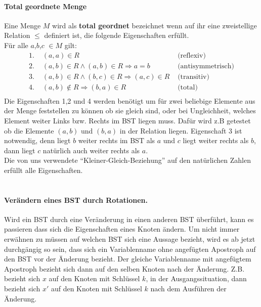 \documentclass[a4paper,12pt]{article}
\begin{document}
\paragraph{Total geordnete Menge} 
Eine Menge $M$ wird als \textbf{total geordnet} bezeichnet wenn auf ihr eine zweistellige Relation $\leq$ definiert ist, die folgende Eigenschaften erfüllt.\\
Für alle $a$,$b$,$c$ $\in M$ gilt:
\begin{align*}
\text{1. } & (a,a) \in R  &\text{  (reflexiv)}\\
\text{2. } & (a,b) \in R  \land  (a,b) \in R \Rightarrow a = b  &\text{  (antisymmetrisch)}\\
\text{3. } & (a,b) \in R  \land  (b,c) \in R \Rightarrow  (a,c) \in R  &\text{  (transitiv)}\\
\text{4. } & (a,b) \notin R \Rightarrow  (b,a) \in R   &\text{  (total)}\\
\end{align*}
Die Eigenschaften 1,2 und 4 werden benötigt um für zwei beliebige Elemente aus der Menge feststellen zu können ob sie gleich sind, oder bei Ungleichheit, welches Element weiter Links bzw. Rechts im BST liegen muss. Dafür wird z.B getestet ob die Elemente $(a,b)$ und $(b, a)$ in der Relation liegen. Eigenschaft 3 ist notwendig, denn liegt $b$ weiter rechts im BST als $a$ und $c$ liegt weiter rechts als $b$, dann liegt $c$ natürlich auch weiter rechts als $a$. \\
Die von uns verwendete \enquote{Kleiner-Gleich-Beziehung} auf den natürlichen Zahlen erfüllt alle Eigenschaften.
\\
\\




\paragraph{Verändern eines BST durch Rotationen.}
Wird ein BST durch eine Veränderung in einen anderen BST überführt, kann es passieren dass sich die Eigenschaften eines Knoten ändern. Um nicht immer erwähnen zu müssen auf welchen BST sich eine Aussage bezieht, wird es ab jetzt durchgängig so sein, dass sich ein Variablenname ohne angefügten Apostroph auf den BST vor der Änderung bezieht. Der gleiche Variablenname mit angefügtem Apostroph bezieht sich dann auf den selben Knoten nach der Änderung. Z.B. bezieht sich $x$ auf den Knoten mit Schlüssel $k$, in der Ausgangssituation, dann bezieht sich $x'$ auf den Knoten mit Schlüssel $k$ nach dem Ausführen der Änderung. \\
\end{document}
